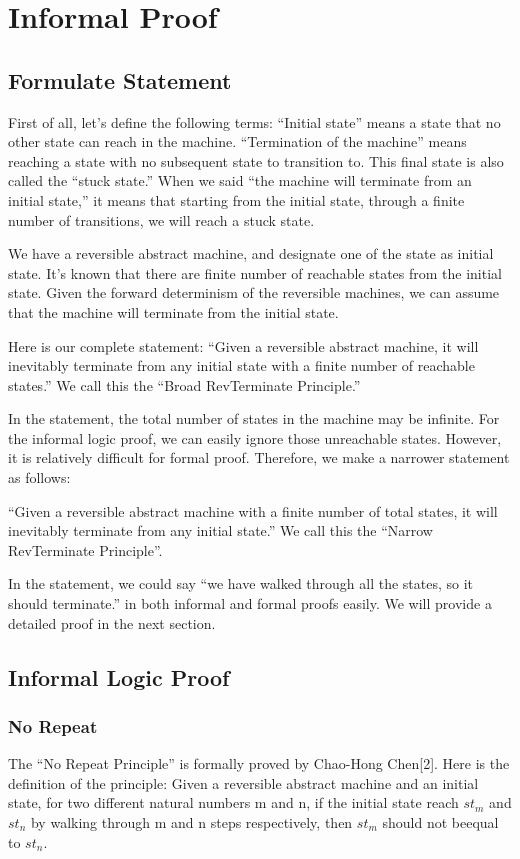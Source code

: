 \chapter{Informal Proof}
\label{chapter:secorder}

\section{Formulate Statement}

First of all, let’s define the following terms:
``Initial state'' means a state that no other state can reach in the machine.
``Termination of the machine'' means reaching a state with no subsequent state to transition to. This final state is also called the ``stuck state.''
When we said ``the machine will terminate from an initial state,'' it means that starting from the initial state, through a finite number of transitions, we will reach a stuck state.

We have a reversible abstract machine, and designate one of the state as initial state.  
It's known that there are finite number of reachable states from the initial state.  
Given the forward determinism of the reversible machines, we can assume that the machine will terminate from the initial state.

Here is our complete statement:
``Given a reversible abstract machine, it will inevitably terminate from any initial state with a finite number of reachable states.''
We call this the ``Broad RevTerminate Principle.''

In the statement, the total number of states in the machine may be infinite.
For the informal logic proof, we can easily ignore those unreachable states.  
However, it is relatively difficult for formal proof. 
Therefore, we make a narrower statement as follows:

``Given a reversible abstract machine with a finite number of total states, it will inevitably terminate from any initial state.''
We call this the ``Narrow RevTerminate Principle''.

In the statement, we could say ``we have walked through all the states, so it should terminate.'' in both informal and formal proofs easily.
We will provide a detailed proof in the next section.

\section{Informal Logic Proof}

\subsection{ No Repeat }
The ``No Repeat Principle'' is formally proved by Chao-Hong Chen[2].
Here is the definition of the principle:
Given a reversible abstract machine and an initial state, for two different natural numbers m and n, if the initial state reach $st_{m}$ and $st_{n}$ by walking through m and n steps respectively, then $st_{m}$ should not beequal to $st_{n}$.

